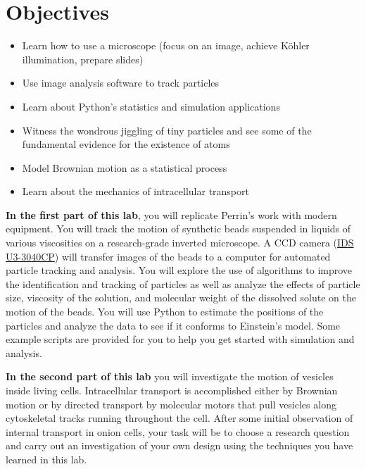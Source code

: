\documentclass{../lab}
\begin{document}
\section{Objectives}

\begin{itemize}
    \item Learn how to use a microscope (focus on an image, achieve K\"ohler illumination, prepare slides)

    \item Use image analysis software to track particles

    \item Learn about Python's statistics and simulation applications

    \item Witness the wondrous jiggling of tiny particles and see some of the fundamental evidence for the existence of atoms

    \item Model Brownian motion as a statistical process

    \item Learn about the mechanics of intracellular transport
\end{itemize}

\textbf{In the first part of this lab}, you will replicate Perrin's work with modern equipment. You will track the motion of synthetic beads suspended in liquids of various viscosities on a research-grade inverted microscope. A CCD camera (\href{https://en.ids-imaging.com/store/u3-3040cp-rev-2-2.html}{IDS U3-3040CP}) will transfer images of the beads to a computer for automated particle tracking and analysis. You will explore the use of algorithms to improve the identification and tracking of particles as well as analyze the effects of particle size, viscosity of the solution, and molecular weight of the dissolved solute on the motion of the beads. You will use Python to estimate the positions of the particles and analyze the data to see if it conforms to Einstein's model. Some example scripts are provided for you to help you get started with simulation and analysis.

\textbf{In the second part of this lab} you will investigate the motion of vesicles inside living cells. Intracellular transport is accomplished either by Brownian motion or by directed transport by molecular motors that pull vesicles along cytoskeletal tracks running throughout the cell. After some initial observation of internal transport in onion cells, your task will be to choose a research question and carry out an investigation of your own design using the techniques you have learned in this lab.
\end{document}
